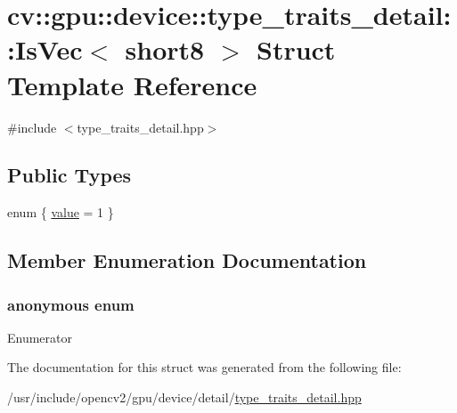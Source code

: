 \hypertarget{structcv_1_1gpu_1_1device_1_1type__traits__detail_1_1IsVec_3_01short8_01_4}{\section{cv\-:\-:gpu\-:\-:device\-:\-:type\-\_\-traits\-\_\-detail\-:\-:Is\-Vec$<$ short8 $>$ Struct Template Reference}
\label{structcv_1_1gpu_1_1device_1_1type__traits__detail_1_1IsVec_3_01short8_01_4}
}


{\ttfamily \#include $<$type\-\_\-traits\-\_\-detail.\-hpp$>$}

\subsection*{Public Types}
\begin{DoxyCompactItemize}
\item 
enum \{ \hyperlink{structcv_1_1gpu_1_1device_1_1type__traits__detail_1_1IsVec_3_01short8_01_4_aca1fe9a5a1a9b1859e6d7535654c0f7fa9c6f0d19e3d3a2eaceb1c71fa503d2cf}{value} = 1
 \}
\end{DoxyCompactItemize}


\subsection{Member Enumeration Documentation}
\hypertarget{structcv_1_1gpu_1_1device_1_1type__traits__detail_1_1IsVec_3_01short8_01_4_aca1fe9a5a1a9b1859e6d7535654c0f7f}{\subsubsection[{anonymous enum}]{\setlength{\rightskip}{0pt plus 5cm}anonymous enum}}\label{structcv_1_1gpu_1_1device_1_1type__traits__detail_1_1IsVec_3_01short8_01_4_aca1fe9a5a1a9b1859e6d7535654c0f7f}
\begin{Desc}
\item[Enumerator]\par
\begin{description}
\item[{\em 
\hypertarget{structcv_1_1gpu_1_1device_1_1type__traits__detail_1_1IsVec_3_01short8_01_4_aca1fe9a5a1a9b1859e6d7535654c0f7fa9c6f0d19e3d3a2eaceb1c71fa503d2cf}{value}\label{structcv_1_1gpu_1_1device_1_1type__traits__detail_1_1IsVec_3_01short8_01_4_aca1fe9a5a1a9b1859e6d7535654c0f7fa9c6f0d19e3d3a2eaceb1c71fa503d2cf}
}]\end{description}
\end{Desc}


The documentation for this struct was generated from the following file\-:\begin{DoxyCompactItemize}
\item 
/usr/include/opencv2/gpu/device/detail/\hyperlink{type__traits__detail_8hpp}{type\-\_\-traits\-\_\-detail.\-hpp}\end{DoxyCompactItemize}
